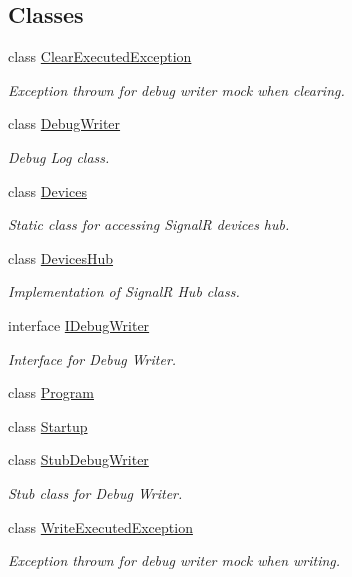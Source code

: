 \subsection*{Classes}
\begin{DoxyCompactItemize}
\item 
class \mbox{\hyperlink{class_f_w_p_s_1_1_clear_executed_exception}{Clear\+Executed\+Exception}}
\begin{DoxyCompactList}\small\item\em Exception thrown for debug writer mock when clearing. \end{DoxyCompactList}\item 
class \mbox{\hyperlink{class_f_w_p_s_1_1_debug_writer}{Debug\+Writer}}
\begin{DoxyCompactList}\small\item\em Debug Log class. \end{DoxyCompactList}\item 
class \mbox{\hyperlink{class_f_w_p_s_1_1_devices}{Devices}}
\begin{DoxyCompactList}\small\item\em Static class for accessing SignalR devices hub. \end{DoxyCompactList}\item 
class \mbox{\hyperlink{class_f_w_p_s_1_1_devices_hub}{Devices\+Hub}}
\begin{DoxyCompactList}\small\item\em Implementation of SignalR Hub class. \end{DoxyCompactList}\item 
interface \mbox{\hyperlink{interface_f_w_p_s_1_1_i_debug_writer}{I\+Debug\+Writer}}
\begin{DoxyCompactList}\small\item\em Interface for Debug Writer. \end{DoxyCompactList}\item 
class \mbox{\hyperlink{class_f_w_p_s_1_1_program}{Program}}
\item 
class \mbox{\hyperlink{class_f_w_p_s_1_1_startup}{Startup}}
\item 
class \mbox{\hyperlink{class_f_w_p_s_1_1_stub_debug_writer}{Stub\+Debug\+Writer}}
\begin{DoxyCompactList}\small\item\em Stub class for Debug Writer. \end{DoxyCompactList}\item 
class \mbox{\hyperlink{class_f_w_p_s_1_1_write_executed_exception}{Write\+Executed\+Exception}}
\begin{DoxyCompactList}\small\item\em Exception thrown for debug writer mock when writing. \end{DoxyCompactList}\end{DoxyCompactItemize}
